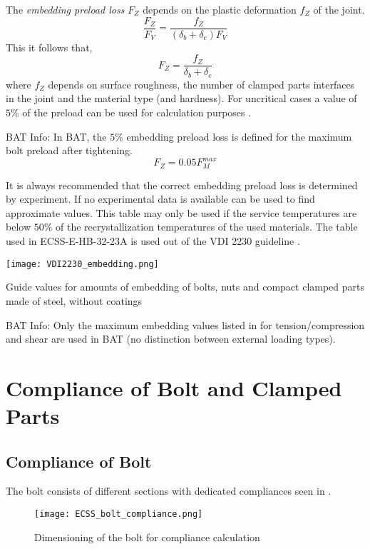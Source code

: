 The \emph{embedding preload loss} $F_Z$ depends on the plastic deformation $f_Z$ of the joint.
\begin{equation*}
  \frac{F_Z}{F_V}=\frac{f_Z}{\left(\delta_b+\delta_c\right)F_V}
\end{equation*}
This it follows that, 
\begin{equation}
  F_Z=\frac{f_Z}{\delta_b+\delta_c}
\end{equation}
where $f_Z$ depends on surface roughness, the number of clamped parts interfaces in the joint and the 
material type (and hardness). For uncritical cases a value of $5\%$ of the preload can be used for 
calculation purposes \cite{ECSS_HB_32_23A}.
\begin{colbox}{BAT Info:}
  In BAT, the $5\%$ embedding preload loss is defined for the maximum bolt preload after tightening.
  \begin{equation*}
    F_Z = 0.05 F_M^{max}
  \end{equation*}
\end{colbox}
It is always recommended that the correct embedding preload loss is determined by experiment. If no 
experimental data is available  can be used to find approximate values. 
This table may only be used if the service temperatures are below $50\%$ of the recrystallization
temperatures of the used materials. The table used in ECSS-E-HB-32-23A \cite{ECSS_HB_32_23A} is used 
out of the VDI 2230 guideline \cite{VDI2230_1}. 
\begin{table}[!htpb]
  \centering
  \texttt{[image: VDI2230\_embedding.png]}
  \caption{Guide values for amounts of embedding of bolts, nuts and compact clamped parts made of steel, without coatings \cite{VDI2230_1}}
  \label{tab:vdi_embedding}
\end{table}
\begin{colbox}{BAT Info:}
  Only the maximum embedding values listed in  for tension/compression and shear 
  are used in BAT (no distinction between external loading types).
\end{colbox}

\section{Compliance of Bolt and Clamped Parts}
\subsection{Compliance of Bolt}
\label{ssec:compl_bolts}
The bolt consists of different sections with dedicated compliances seen in .
\begin{figure}[!htpb]
  \centering
  \texttt{[image: ECSS\_bolt\_compliance.png]}
  \caption{Dimensioning of the bolt for compliance calculation \cite{ECSS_HB_32_23A}}
  \label{fig:ECSS_bolt_compliance}
\end{figure}


